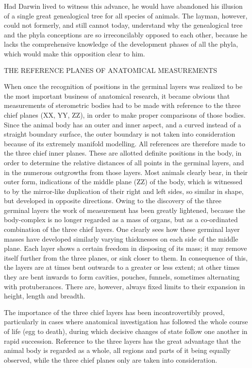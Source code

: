 Had Darwin lived to witness this advance, he would have abandoned his illusion of a single
great genealogical tree for all species of animals. The layman, however, could not formerly,
and still cannot today, understand why the genealogical tree and the phyla conceptions are so
irreconcilably opposed to each other, because he lacks the comprehensive knowledge of the
development phases of all the phyla, which would make this opposition clear to him.

THE REFERENCE PLANES OF ANATOMICAL MEASUREMENTS

When once the recognition of positions in the germinal layers was realized to be the most
important business of anatomical research, it became obvious that measurements of
sterometric bodies had to be made with reference to the three chief planes (XX, YY, ZZ), in
order to make proper comparisons of those bodies. Since the animal body has an outer and
inner aspect, and a curved instead of a straight boundary surface, the outer boundary is not
taken into consideration because of its extremely manifold modelling. All references are
therefore made to the three chief inner planes. These are allotted definite positions in the
body, in order to determine the relative distances of all points in the germinal layers, and in
the numerous outgrowths from those layers. Most animals clearly bear, in their outer form,
indications of the middle plane (ZZ) of the body, which is witnessed to by the mirror-like
duplication of their right and left sides, so similar in shape, but developed in opposite
directions. Owing to the discovery of the three germinal layers the work of measurement has
been greatly lightened, because the body-complex is no longer regarded as a mass of organs,
but as a co-ordinated combination of the three chief layers. One clearly sees how these
germinal layer masses have developed similarly varying thicknesses on each side of the
middle plane. Each layer shows a certain freedom in disposing of its mass; it may remove
itself further from the three planes, or sink closer to them. In consequence of this, the layers
are at times bent outwards to a greater or less extent; at other times they are bent inwards to
form cavities, pouches, funnels, sometimes alternating with protuberances. There are,
however, always fixed limits to their expansion in height, length and breadth.

The importance of the three chief layers has been incontrovertibly proved, particularly in
cases where anatomical investigation has followed the whole course of life (egg to death),
during which decisive changes of state follow one another in rapid succession. Reference to
the three layers has the great advantage that the animal body is regarded as a whole, all
regions and parts of it being equally observed, while the three chief planes only are taken into
consideration.

